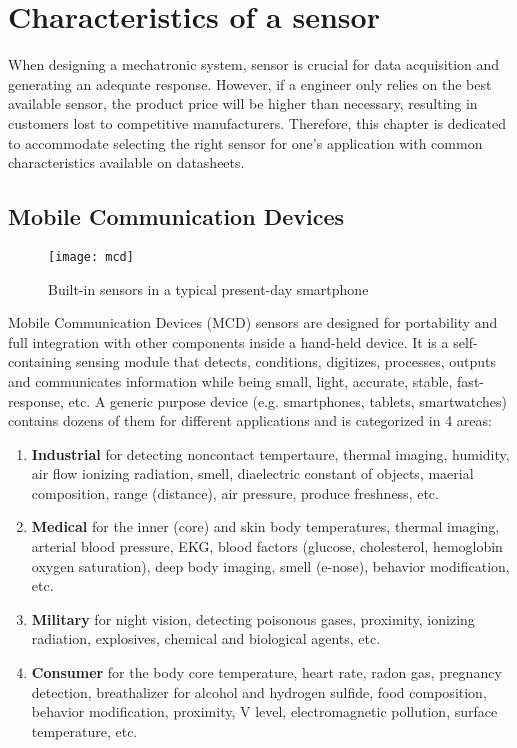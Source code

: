 \chapter{Characteristics of a sensor}
When designing a mechatronic system, sensor is crucial for data acquisition and generating an adequate response. However, if a engineer only relies on the best available sensor, the product price will be higher than necessary, resulting in customers lost to competitive manufacturers. Therefore, this chapter is dedicated to accommodate selecting the right sensor for one's application with common characteristics available on datasheets.

\section{Mobile Communication Devices}
\begin{figure}[ht]
	\centering
	\texttt{[image: mcd]}
	\caption{Built-in sensors in a typical present-day smartphone}
\end{figure}
Mobile Communication Devices (MCD) sensors are designed for portability and full integration with other components inside a hand-held device. It is a self-containing sensing module that detects, conditions, digitizes, processes, outputs and communicates information while being small, light, accurate, stable, fast-response, etc. A generic purpose device (e.g. smartphones, tablets, smartwatches) contains dozens of them for different applications and is categorized in 4 areas:
\begin{enumerate}
	\item \textbf{Industrial} for detecting noncontact tempertaure, thermal imaging, humidity, air flow ionizing radiation, smell, diaelectric constant of objects, maerial composition, range (distance), air pressure, produce freshness, etc.
	\item \textbf{Medical} for the inner (core) and skin body temperatures, thermal imaging, arterial blood pressure, EKG, blood factors (glucose, cholesterol, hemoglobin oxygen saturation), deep body imaging, smell (e-nose), behavior modification, etc.
	\item \textbf{Military} for night vision, detecting poisonous gases, proximity, ionizing radiation, explosives, chemical and biological agents, etc.
	\item \textbf{Consumer} for the body core temperature, heart rate, radon gas, pregnancy detection, breathalizer for alcohol and hydrogen sulfide, food composition, behavior modification, proximity, V level, electromagnetic pollution, surface temperature, etc.
\end{enumerate}

